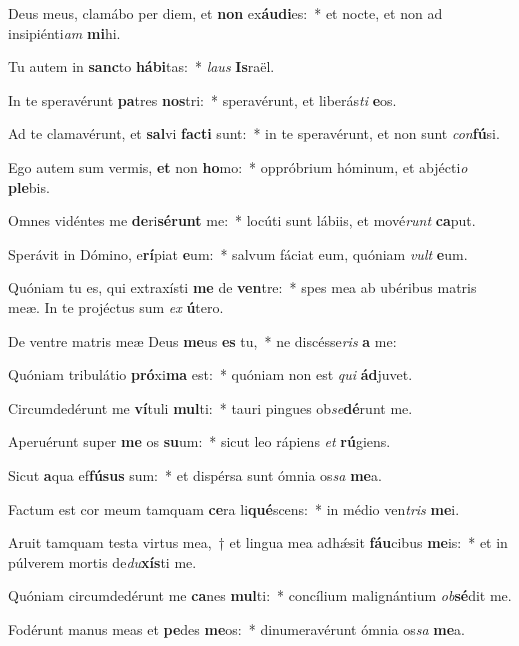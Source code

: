 \item Deus meus, clamábo per diem, et \textbf{non} ex\textbf{áu}\textbf{di}es:~* et nocte, et non ad insipiénti\textit{am} \textbf{mi}hi.
\item Tu autem in \textbf{sanc}to \textbf{há}\textbf{bi}tas:~* \textit{laus} \textbf{Is}raël.
\item In te speravérunt \textbf{pa}tres \textbf{nos}tri:~* speravérunt, et liberás\textit{ti} \textbf{e}os.
\item Ad te clamavérunt, et \textbf{sal}vi \textbf{fac}\textbf{ti} sunt:~* in te speravérunt, et non sunt \textit{con}\textbf{fú}si.
\item Ego autem sum vermis, \textbf{et} non \textbf{ho}mo:~* oppróbrium hóminum, et abjécti\textit{o} \textbf{ple}bis.
\item Omnes vidéntes me \textbf{de}ri\textbf{sé}\textbf{runt} me:~* locúti sunt lábiis, et mové\textit{runt} \textbf{ca}put.
\item Sperávit in Dómino, e\textbf{rí}piat \textbf{e}um:~* salvum fáciat eum, quóniam \textit{vult} \textbf{e}um.
\item Quóniam tu es, qui extraxísti \textbf{me} de \textbf{ven}tre:~* spes mea ab ubéribus matris meæ. In te projéctus sum \textit{ex} \textbf{ú}tero.
\item De ventre matris meæ Deus \textbf{me}us \textbf{es} tu,~* ne discésse\textit{ris} \textbf{a} me:
\item Quóniam tribulátio \textbf{pró}xi\textbf{ma} est:~* quóniam non est \textit{qui} \textbf{ád}juvet.
\item Circumdedérunt me \textbf{ví}tuli \textbf{mul}ti:~* tauri pingues ob\textit{se}\textbf{dé}runt me.
\item Aperuérunt super \textbf{me} os \textbf{su}um:~* sicut leo rápiens \textit{et} \textbf{rú}giens.
\item Sicut \textbf{a}qua ef\textbf{fú}\textbf{sus} sum:~* et dispérsa sunt ómnia os\textit{sa} \textbf{me}a.
\item Factum est cor meum tamquam \textbf{ce}ra li\textbf{qué}scens:~* in médio ven\textit{tris} \textbf{me}i.
\item Aruit tamquam testa virtus mea,~† et lingua mea adhǽsit \textbf{fáu}cibus \textbf{me}is:~* et in púlverem mortis de\textit{du}\textbf{xís}ti me.
\item Quóniam circumdedérunt me \textbf{ca}nes \textbf{mul}ti:~* concílium malignántium \textit{ob}\textbf{sé}dit me.
\item Fodérunt manus meas et \textbf{pe}des \textbf{me}os:~* dinumeravérunt ómnia os\textit{sa} \textbf{me}a.
